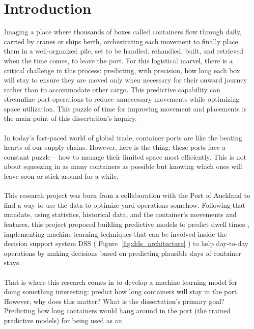 \chapter{Introduction}%
	Imaging a place where thousands of boxes called containers flow through daily, carried by cranes or ships berth,
	orchestrating each movement to finally place them in a well-organized pile, set to be handled, rehandled,
	built, and retrieved when the time comes, to leave the port. For this logistical marvel, there is a critical
	challenge in this process: predicting, with precision, how long each box will stay to ensure they are moved only
	when necessary for their onward journey rather than to accommodate other cargo. This predictive capability can
	streamline port operations to reduce unnecessary movements while optimizing space utilization. This puzzle of
	time for improving movement and placements is the main point of this dissertation's inquiry.
	\\
	\\
	In today's fast-paced world of global trade, container ports are like the beating hearts of our supply chains.
	However, here is the thing: these ports face a constant puzzle – how to manage their limited space most
	efficiently. This is not about squeezing in as many containers as possible but knowing which ones will leave
	soon or stick around for a while.
	\\
	\\
	This research project was born from a collaboration with the Port of Auckland to find a way to use the data to
	optimize yard operations somehow. Following that mandate, using statistics, historical data, and the container’s
	movements and features, this project proposed building predictive models to predict dwell times
	\cite{merckx2005issue}
	, implementing machine learning techniques that can be involved inside the decision support system DSS (
	Figure~\ref{fig:dds_architecture}
	) to help day-to-day operations by making decisions based on predicting plausible days of container stays.
	\\
	\\
	That is where this research comes in to develop a machine learning model for doing something interesting: predict
	how long containers will stay in the port. However, why does this matter? What is the dissertation's primary goal?
	Predicting how long containers would hang around in the port (the trained predictive models) for being used as an
